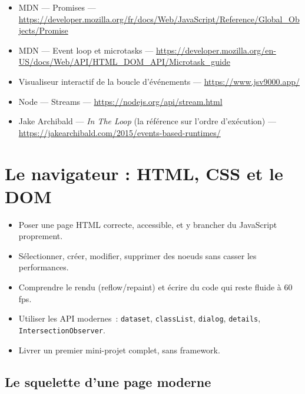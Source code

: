 \documentclass[12pt,a4paper,twoside,openright]{book}
\begin{document}
\begin{ressources}
\begin{itemize}
  \item MDN --- Promises --- \url{https://developer.mozilla.org/fr/docs/Web/JavaScript/Reference/Global_Objects/Promise}
  \item MDN --- Event loop et microtasks --- \url{https://developer.mozilla.org/en-US/docs/Web/API/HTML_DOM_API/Microtask_guide}
  \item Visualiseur interactif de la boucle d'\'ev\'enements --- \url{https://www.jsv9000.app/}
  \item Node --- Streams --- \url{https://nodejs.org/api/stream.html}
  \item Jake Archibald --- \emph{In The Loop} (la r\'ef\'erence sur l'ordre d'ex\'ecution) --- \url{https://jakearchibald.com/2015/events-based-runtimes/}
\end{itemize}
\end{ressources}

\chapter{Le navigateur : HTML, CSS et le DOM}
\label{ch-js-dom}

\begin{objectif}
\begin{itemize}
  \item Poser une page HTML correcte, accessible, et y brancher du JavaScript proprement.
  \item S\'electionner, cr\'eer, modifier, supprimer des noeuds sans casser les performances.
  \item Comprendre le rendu (reflow/repaint) et \'ecrire du code qui reste fluide \`a 60 fps.
  \item Utiliser les API modernes~: \texttt{dataset}, \texttt{classList}, \texttt{dialog},
        \texttt{details}, \texttt{IntersectionObserver}.
  \item Livrer un premier mini-projet complet, sans framework.
\end{itemize}
\end{objectif}

\section{Le squelette d'une page moderne}
\end{document}
